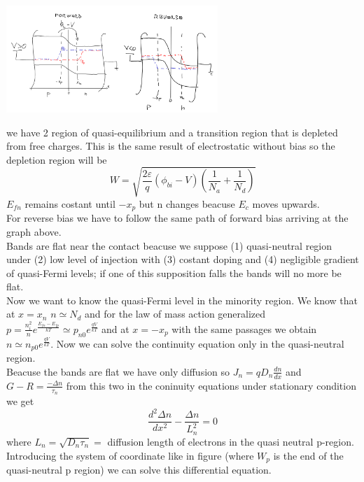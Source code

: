 \centering
\includegraphics[width=0.6\textwidth]{pn9.png}\\
\raggedright

we have 2 region of quasi-equilibrium and a transition region that is depleted from free charges. This is the same result of electrostatic without bias so the depletion region will be
\begin{equation}
W=\sqrt{\frac{2\varepsilon}{q}(\phi_{bi}-V)(\frac{1}{N_a}+\frac{1}{N_d})}
\end{equation}
$E_{fn}$ remains costant until $-x_p$ but n changes beacuse $E_c$ moves upwards.\\
For reverse bias we have to follow the same path of forward bias arriving at the graph above.\\
Bands are flat near the contact beacuse we suppose (1) quasi-neutral region under (2) low level of injection with (3) costant doping and (4) negligible gradient of quasi-Fermi levels; if one of this supposition falls the bands will no more be flat.\\
\vspace{5mm}
\label{cont.eq}
Now we want to know the quasi-Fermi level in the minority region.
We know that at $x=x_n$ $n\simeq N_d$ and for the law of mass action generalized $p=\frac{n_i^2}{n}e^{\frac{E_{fn}-E_{fp}}{kT}}\simeq p_{n0}e^{\frac{qV}{kT}}$ and at $x=-x_p$ with the same passages we obtain $n\simeq n_{p0}e^{\frac{qV}{kT}}$. Now we can solve the continuity equation only in the quasi-neutral region. \\
Beacuse the bands are flat we have only diffusion so $J_n=qD_n \frac{dn}{dx}$ and $G-R=\frac{-\Delta n}{\tau_n}$ from this two in the coninuity equations under stationary condition we get
\begin{equation}
\frac{d^2\Delta n}{dx^2}-\frac{\Delta n}{L_n^2}=0
\end{equation} 
where $L_n=\sqrt{D_n\tau_n}=$ diffusion length of electrons in the quasi neutral p-region. Introducing the system of coordinate like in figure (where $W_p$ is the end of the quasi-neutral p region) we can solve this differential equation.

